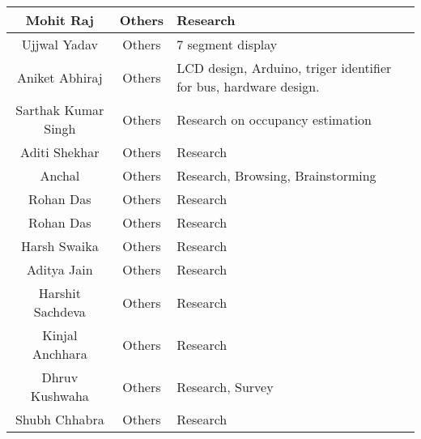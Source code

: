 \begin{center}
\begin{longtable}{ | c | c | m{6cm} | }
        \hline
        Mohit Raj                  & Others            & Research                                                                \\
        \hline
        Ujjwal Yadav               & Others            & 7 segment display                                                       \\
        \hline
        Aniket Abhiraj             & Others            & LCD design, Arduino, triger identifier for bus, hardware design.        \\
        \hline
        Sarthak Kumar Singh        & Others            & Research on occupancy estimation                                        \\
        \hline
        Aditi Shekhar              & Others            & Research                                                                \\
        \hline
        Anchal                     & Others            & Research, Browsing, Brainstorming                                       \\
        \hline
        Rohan Das                  & Others            & Research                                                                \\
        \hline
        Rohan Das                  & Others            & Research                                                                \\
        \hline
        Harsh Swaika               & Others            & Research                                                                \\
        \hline
        Aditya Jain                & Others            & Research                                                                \\
        \hline
        Harshit Sachdeva           & Others            & Research                                                                \\
        \hline
        Kinjal Anchhara            & Others            & Research                                                                \\
        \hline
        Dhruv Kushwaha             & Others            & Research, Survey                                                        \\
        \hline
        Shubh Chhabra              & Others            & Research                                                                \\

\end{longtable}
\end{center}
